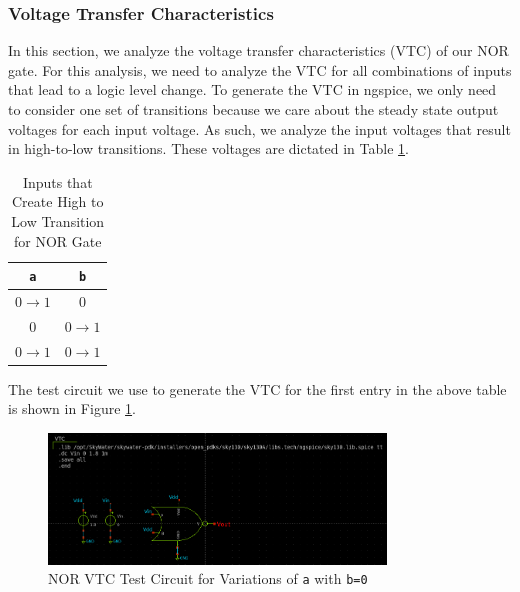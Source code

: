 \documentclass[fleqn]{article}
\begin{document}
	\subsubsection{Voltage Transfer Characteristics}
	
	In this section, we analyze the voltage transfer characteristics (VTC) of our NOR gate. For this analysis, we need to analyze the VTC for all combinations of inputs that lead to a logic level change. To generate the VTC in ngspice, we only need to consider one set of transitions because we care about the steady state output voltages for each input voltage. As such, we analyze the input voltages that result in high-to-low transitions. These voltages are dictated in Table \ref{table::nor_gate_high_to_low_transitions}.
	
	\begin{table}[H]
	\begin{center}
	\caption{Inputs that Create High to Low Transition for NOR Gate}
	\label{table::nor_gate_high_to_low_transitions}
	\begin{tabular}{| c | c |}
		\hline
		\texttt{a} & \texttt{b} \\
		\hline	
		$0 \rightarrow 1$ & $0$\\
		\hline	
		$0$ & $0 \rightarrow 1$\\
		\hline	
		$0 \rightarrow 1$ & $0 \rightarrow 1$\\
		\hline
	\end{tabular}
	\end{center}
	\end{table}
	
	\noindent The test circuit we use to generate the VTC for the first entry in the above table is shown in Figure \ref{fig::nor_vtc_test_sweep_va}.
	
	\begin{figure}[H]
		\centerline{\includegraphics[width=0.8\textwidth]{nor_vtc_test_sweep_va.png}}
		\caption{NOR VTC Test Circuit for Variations of \texttt{a} with \texttt{b=0}}
		\label{fig::nor_vtc_test_sweep_va}
	\end{figure}	
	
\end{document}
